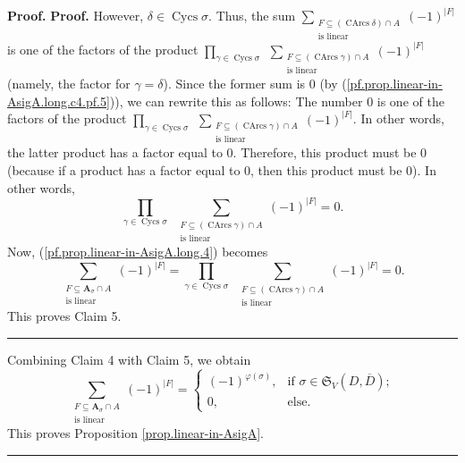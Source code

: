 \documentclass[numbers=enddot,12pt,final,onecolumn,notitlepage]{scrartcl}%
\numberwithin{exer}{section}
\theoremstyle{definition}
\newenvironment{proof}[1][Proof]{\noindent\textbf{#1.} }{\ \rule{0.5em}{0.5em}}
\let\sumnonlimits\sum
\let\prodnonlimits\prod
\renewcommand{\sum}{\sumnonlimits\limits}
\renewcommand{\prod}{\prodnonlimits\limits}
\newenvironment{verlong}{}{}
\begin{document}
\begin{verlong}
\begin{proof}
\begin{proof}
However, $\delta\in\operatorname*{Cycs}\sigma$. Thus, the sum $\sum
_{\substack{F\subseteq\left(  \operatorname*{CArcs}\delta\right)  \cap
A\\\text{is linear}}}\left(  -1\right)  ^{\left\vert F\right\vert }$ is one of
the factors of the product $\prod_{\gamma\in\operatorname*{Cycs}\sigma
}\ \ \sum_{\substack{F\subseteq\left(  \operatorname*{CArcs}\gamma\right)
\cap A\\\text{is linear}}}\left(  -1\right)  ^{\left\vert F\right\vert }$
(namely, the factor for $\gamma=\delta$). Since the former sum is $0$ (by
(\ref{pf.prop.linear-in-AsigA.long.c4.pf.5})), we can rewrite this as follows:
The number $0$ is one of the factors of the product $\prod_{\gamma
\in\operatorname*{Cycs}\sigma}\ \ \sum_{\substack{F\subseteq\left(
\operatorname*{CArcs}\gamma\right)  \cap A\\\text{is linear}}}\left(
-1\right)  ^{\left\vert F\right\vert }$. In other words, the latter product
has a factor equal to $0$. Therefore, this product must be $0$ (because if a
product has a factor equal to $0$, then this product must be $0$). In other
words,%
\[
\prod_{\gamma\in\operatorname*{Cycs}\sigma}\ \ \sum_{\substack{F\subseteq
\left(  \operatorname*{CArcs}\gamma\right)  \cap A\\\text{is linear}}}\left(
-1\right)  ^{\left\vert F\right\vert }=0.
\]
Now, (\ref{pf.prop.linear-in-AsigA.long.4}) becomes%
\[
\sum_{\substack{F\subseteq\mathbf{A}_{\sigma}\cap A\\\text{is linear}}}\left(
-1\right)  ^{\left\vert F\right\vert }=\prod_{\gamma\in\operatorname*{Cycs}%
\sigma}\ \ \sum_{\substack{F\subseteq\left(  \operatorname*{CArcs}%
\gamma\right)  \cap A\\\text{is linear}}}\left(  -1\right)  ^{\left\vert
F\right\vert }=0.
\]
This proves Claim 5.
\end{proof}

Combining Claim 4 with Claim 5, we obtain%
\[
\sum_{\substack{F\subseteq\mathbf{A}_{\sigma}\cap A\\\text{is linear}}}\left(
-1\right)  ^{\left\vert F\right\vert }=%
\begin{cases}
\left(  -1\right)  ^{\varphi\left(  \sigma\right)  }, & \text{if }\sigma
\in\mathfrak{S}_{V}\left(  D,\overline{D}\right)  ;\\
0, & \text{else.}%
\end{cases}
\]
This proves Proposition \ref{prop.linear-in-AsigA}.
\end{proof}
\end{verlong}
\end{document}
